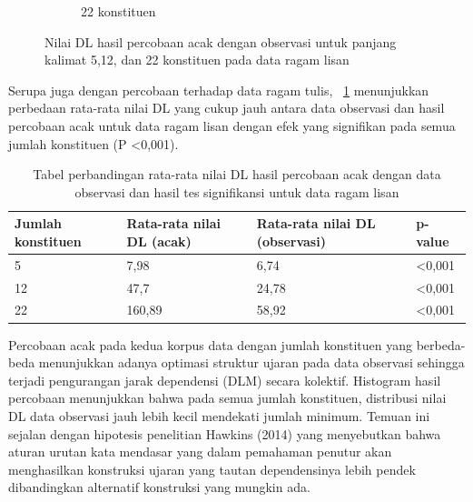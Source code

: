 \begin{figure}
\begin{subfigure}{.45\textwidth}
  \caption{22 konstituen}
  \label{fig:l22randomobs} 
\end{subfigure}

\caption{Nilai DL hasil percobaan acak dengan observasi untuk panjang kalimat 5,12, dan 22 konstituen pada data ragam lisan}
\label{fig:lrandomobs}
\end{figure}

Serupa juga dengan percobaan terhadap data ragam tulis, \tab~\ref{tab:perbandingan_DL_lisan} menunjukkan perbedaan rata-rata nilai DL yang cukup jauh antara data observasi dan hasil percobaan acak untuk data ragam lisan dengan efek yang signifikan pada semua jumlah konstituen (P \textless 0,001).

\begin{table}
\begin{center}
\begin{small}
  \caption{Tabel perbandingan rata-rata nilai DL hasil percobaan acak dengan data observasi dan hasil tes signifikansi untuk data ragam lisan}  \label{tab:perbandingan_DL_lisan}
  \begin{tabular}{ | l | l | l | l |}
    \hline
	 Jumlah konstituen & Rata-rata nilai DL (acak) & Rata-rata nilai DL (observasi) & p-value \\ \hline
	 5 & 7,98 & 6,74 & \textless 0,001 \\ \hline
	 12 & 47,7 & 24,78 & \textless 0,001 \\ \hline
	 22 & 160,89 & 58,92 & \textless 0,001 \\ \hline
  \end{tabular}
  \end{small}
\end{center}
\end{table}

Percobaan acak pada kedua korpus data dengan jumlah konstituen yang berbeda-beda menunjukkan adanya optimasi struktur ujaran pada data observasi sehingga terjadi pengurangan jarak dependensi (DLM) secara kolektif. Histogram hasil percobaan menunjukkan bahwa pada semua jumlah konstituen, distribusi nilai DL data observasi jauh lebih kecil mendekati jumlah minimum. Temuan ini sejalan dengan hipotesis penelitian Hawkins (2014) yang menyebutkan bahwa aturan urutan kata mendasar yang dalam pemahaman penutur akan menghasilkan konstruksi ujaran yang tautan dependensinya lebih pendek dibandingkan alternatif konstruksi yang mungkin ada.

